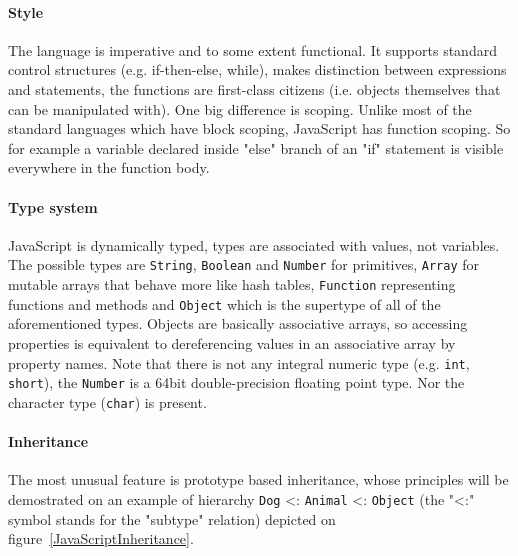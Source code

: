\documentclass[12pt,a4paper]{report}
\begin{document}
\paragraph{Style} The language is imperative and to some extent functional. It supports standard control structures (e.g. if-then-else, while), makes distinction between expressions and statements, the functions are first-class citizens (i.e. objects themselves that can be manipulated with). One big difference is scoping. Unlike most of the standard languages which have block scoping, JavaScript has function scoping. So for example a variable declared inside "else" branch of an "if" statement is visible everywhere in the function body.

\paragraph{Type system} JavaScript is dynamically typed, types are associated with values, not variables. The possible types are \texttt{String}, \texttt{Boolean} and \texttt{Number} for primitives, \texttt{Array} for mutable arrays that behave more like hash tables, \texttt{Function} representing functions and methods and \texttt{Object} which is the supertype of all of the aforementioned types. Objects are basically associative arrays, so accessing properties is equivalent to dereferencing values in an associative array by property names. Note that there is not any integral numeric type (e.g. \texttt{int}, \texttt{short}), the \texttt{Number} is a 64bit double-precision floating point type. Nor the character type (\texttt{char}) is present.

\paragraph{Inheritance} The most unusual feature is prototype based inheritance, whose principles will be demostrated on an example of hierarchy \texttt{Dog} \textless: \texttt{Animal} \textless: \texttt{Object} (the "\textless:" symbol stands for the "subtype" relation) depicted on figure~\ref{JavaScriptInheritance}. 
\end{document}
